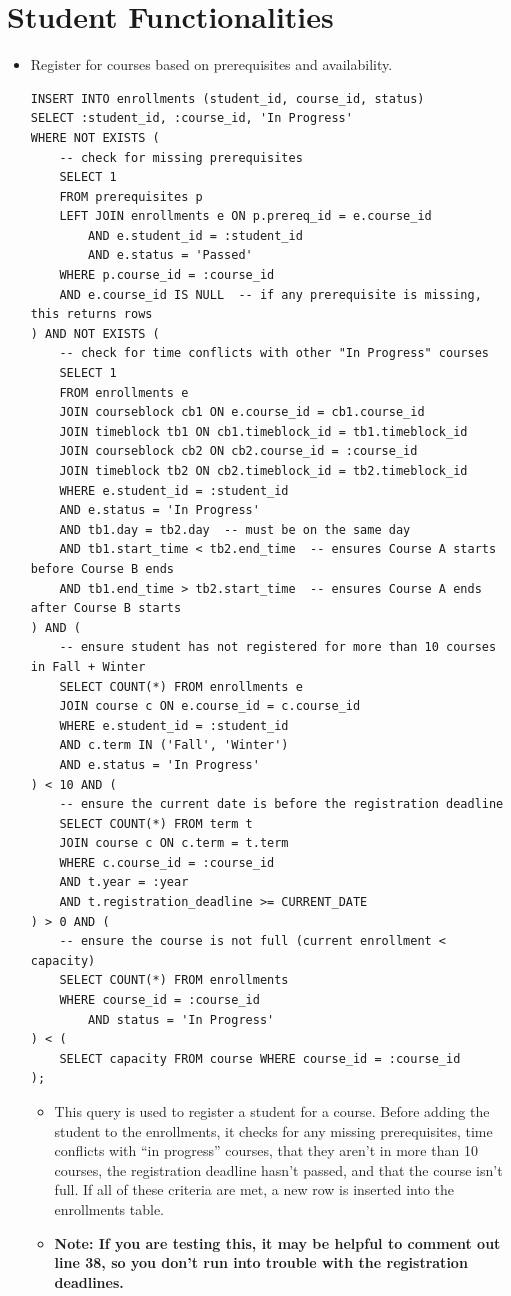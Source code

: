 \documentclass{report}
\newcommand{\usection}[1]{\section*{#1}
\addcontentsline{toc}{section}{\protect\numberline{}#1}}
\begin{document}
\pagebreak

\usection{Student Functionalities}

\begin{itemize}
    
    \item Register for courses based on prerequisites and availability.
    \begin{lstlisting}
INSERT INTO enrollments (student_id, course_id, status)
SELECT :student_id, :course_id, 'In Progress'
WHERE NOT EXISTS (
    -- check for missing prerequisites
    SELECT 1
    FROM prerequisites p
    LEFT JOIN enrollments e ON p.prereq_id = e.course_id
        AND e.student_id = :student_id
        AND e.status = 'Passed'
    WHERE p.course_id = :course_id
    AND e.course_id IS NULL  -- if any prerequisite is missing, this returns rows
) AND NOT EXISTS (
    -- check for time conflicts with other "In Progress" courses
    SELECT 1
    FROM enrollments e
    JOIN courseblock cb1 ON e.course_id = cb1.course_id
    JOIN timeblock tb1 ON cb1.timeblock_id = tb1.timeblock_id
    JOIN courseblock cb2 ON cb2.course_id = :course_id
    JOIN timeblock tb2 ON cb2.timeblock_id = tb2.timeblock_id
    WHERE e.student_id = :student_id
    AND e.status = 'In Progress'
    AND tb1.day = tb2.day  -- must be on the same day
    AND tb1.start_time < tb2.end_time  -- ensures Course A starts before Course B ends
    AND tb1.end_time > tb2.start_time  -- ensures Course A ends after Course B starts
) AND (
    -- ensure student has not registered for more than 10 courses in Fall + Winter
    SELECT COUNT(*) FROM enrollments e
    JOIN course c ON e.course_id = c.course_id
    WHERE e.student_id = :student_id
    AND c.term IN ('Fall', 'Winter')
    AND e.status = 'In Progress'
) < 10 AND (
    -- ensure the current date is before the registration deadline
    SELECT COUNT(*) FROM term t
    JOIN course c ON c.term = t.term
    WHERE c.course_id = :course_id
    AND t.year = :year
    AND t.registration_deadline >= CURRENT_DATE
) > 0 AND (
    -- ensure the course is not full (current enrollment < capacity)
    SELECT COUNT(*) FROM enrollments
    WHERE course_id = :course_id
        AND status = 'In Progress'
) < (
    SELECT capacity FROM course WHERE course_id = :course_id
);
    \end{lstlisting}
    \begin{itemize}
        \item This query is used to register a student for a course. Before adding the student to the enrollments, it checks for any missing prerequisites, time conflicts with ``in progress'' courses, that they aren't in more than 10 courses, the registration deadline hasn't passed, and that the course isn't full. If all of these criteria are met, a new row is inserted into the enrollments table.
        \item \textbf{Note: If you are testing this, it may be helpful to comment out line 38, so you don't run into trouble with the registration deadlines.}
    \end{itemize}
    

\end{itemize}
\end{document}

